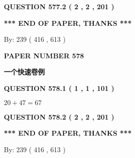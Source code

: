 \documentclass{ctexart}
\begin{document}
{\textbf{\Large{QUESTION
577.2 
 ( 2 , 2 , 201 )
}}}
  
  
   
   
 \vspace{0.2in}
 
   
   
   
   
\vspace{1.0in} 
{\textbf{\large{ *** END OF PAPER, THANKS *** }}} 
   
   
\hspace{1.0in} By: 
 239 ( 416 ,  613 )
   
   
   
   
\newpage 
\setcounter{page}{ 
   578001 } 
   
   
   
   
 {\textbf{ \Large{ PAPER NUMBER  578  }}}
   
   
\vspace{0.2in}
   
   
   
   
   
   
 \vspace{0.2in}
{\LARGE {\textbf{ 一个快速卷例}}}
   
   
  
\vspace{0.2in}
  
{\textbf{\Large{QUESTION
578.1 
 ( 1 , 1 , 101 )
}}}
  
  
 
 

$ %
20 +  %
47=   %
67$
 
 
  
\vspace{0.2in}
  
{\textbf{\Large{QUESTION
578.2 
 ( 2 , 2 , 201 )
}}}
  
  
   
   
 \vspace{0.2in}
 
   
   
   
   
\vspace{1.0in} 
{\textbf{\large{ *** END OF PAPER, THANKS *** }}} 
   
   
\hspace{1.0in} By: 
 239 ( 416 ,  613 )
   
   
   
   
\newpage 
\setcounter{page}{ 
   579001 } 
   
\end{document}
